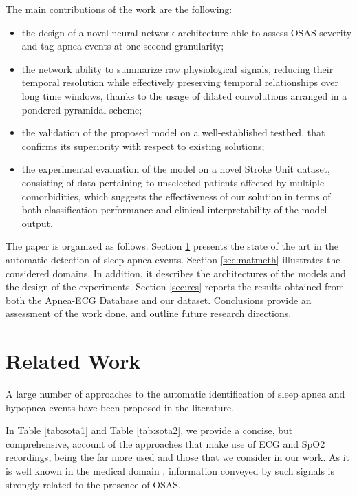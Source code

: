 \documentclass[5p,twocolumn,lefttitle]{elsarticle}
\begin{document}
\smallskip

The main contributions of the work are the following:
\begin{itemize}
    \item the design of a novel neural network architecture able to assess OSAS severity and tag apnea events at one-second granularity; 
    \item the network ability to summarize raw physiological signals, reducing their temporal resolution while effectively preserving temporal relationships over long time windows, thanks to the usage of dilated convolutions arranged in a pondered pyramidal scheme;
    \item the validation of the proposed model on a well-established testbed, that confirms its superiority with respect to existing solutions;
    \item the experimental evaluation of the model on a novel Stroke Unit dataset, consisting of data pertaining to unselected patients affected by multiple comorbidities, which suggests the effectiveness of our solution in terms of both classification performance and clinical interpretability of the model 
    output.
\end{itemize}

The paper is organized as follows. Section \ref{sec:related} presents the state of the art in the automatic detection of sleep apnea events. Section \ref{sec:matmeth} illustrates the considered domains. 
In addition, it describes the architectures of the models and the design of the experiments. Section \ref{sec:res} reports the  results obtained from both the Apnea-ECG Database and our dataset. Conclusions provide an assessment of the  work done, and outline future research directions.




\section{Related Work}
\label{sec:related}

A large number of approaches to the automatic identification of sleep apnea and hypopnea events have been proposed in the literature. 

In Table \ref{tab:sota1} and Table \ref{tab:sota2}, we provide a concise, but comprehensive, account of the approaches that make use of ECG and SpO2 recordings, being the far more used and those that we consider in our work. 
As it is well known in the medical domain \cite{wali2020correlation,ucak2021heart}, information conveyed by such signals is strongly related to the presence of OSAS. 
\end{document}
